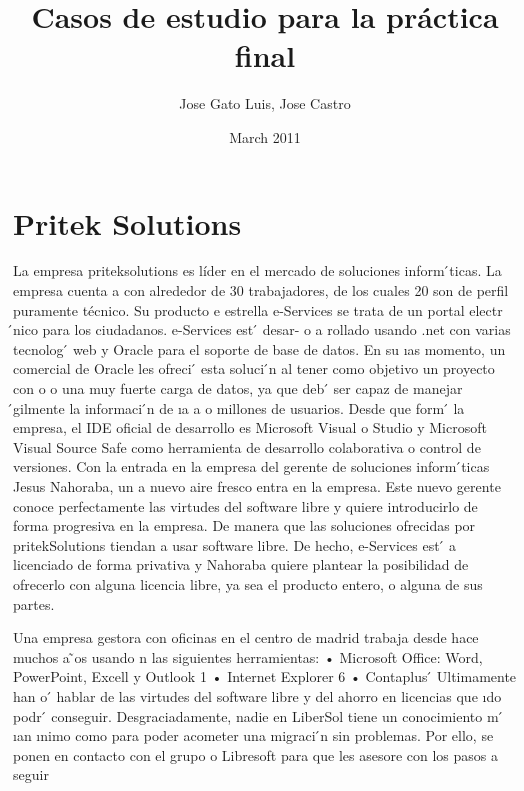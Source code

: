 \documentclass[a4paper]{article}
\title{\textbf{Casos de estudio para la práctica final}}
\author{Jose Gato Luis, Jose Castro}
\date{March 2011}
\begin{document}
 \section{Pritek Solutions}
La empresa priteksolutions es líder en el mercado de soluciones inform ́ticas. La empresa cuenta
a
con alrededor de 30 trabajadores, de los cuales 20 son de perfil puramente técnico. Su producto
e
estrella e-Services se trata de un portal electr ́nico para los ciudadanos. e-Services est ́ desar-
o
a
rollado usando .net con varias tecnolog ́ web y Oracle para el soporte de base de datos. En su
ıas
momento, un comercial de Oracle les ofreci ́ esta soluci ́n al tener como objetivo un proyecto con
o
o
una muy fuerte carga de datos, ya que deb ́ ser capaz de manejar  ́gilmente la informaci ́n de
ıa
a
o
millones de usuarios. Desde que form ́ la empresa, el IDE oficial de desarrollo es Microsoft Visual
o
Studio y Microsoft Visual Source Safe como herramienta de desarrollo colaborativa o control de
versiones.
Con la entrada en la empresa del gerente de soluciones inform ́ticas Jesus Nahoraba, un
a
nuevo aire fresco entra en la empresa. Este nuevo gerente conoce perfectamente las virtudes
del software libre y quiere introducirlo de forma progresiva en la empresa. De manera que las
soluciones ofrecidas por pritekSolutions tiendan a usar software libre. De hecho, e-Services est ́
a
licenciado de forma privativa y Nahoraba quiere plantear la posibilidad de ofrecerlo con alguna
licencia libre, ya sea el producto entero, o alguna de sus partes.




Una empresa gestora con oficinas en el centro de madrid trabaja desde hace muchos a ̃os usando
n
las siguientes herramientas:
• Microsoft Office: Word, PowerPoint, Excell y Outlook
1
• Internet Explorer 6
• Contaplus
 ́
Ultimamente han o ́ hablar de las virtudes del software libre y del ahorro en licencias que
ıdo
podr ́ conseguir. Desgraciadamente, nadie en LiberSol tiene un conocimiento m ́
ıan
ınimo como
para poder acometer una migraci ́n sin problemas. Por ello, se ponen en contacto con el grupo
o
Libresoft para que les asesore con los pasos a seguir
 
\end{document}
